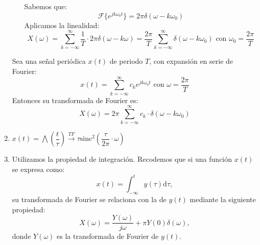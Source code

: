 \begin{enumerate}[label=\color{red}\textbf{\arabic*)}]
\begin{enumerate}[label=Paso \arabic*:]
    Sabemos que: \[
    \mathcal{F}\{e^{jk\omega_0t} \} =2\pi\delta(\omega-k\omega_0)
    \] 
    Aplicamos la linealidad: \[
    X(\omega)=\sum_{k=-\infty}^{\infty} \dfrac{1}{T}\cdot 2\pi\delta(\omega-k\omega)=\dfrac{2\pi}{T}\sum_{k=-\infty}^{\infty} \delta(\omega-k\omega_0)\text{ con }\omega_0=\dfrac{2\pi}{T}
    \] 
\end{enumerate}
\begin{tcolorbox}[colback=red!5!white, colframe=red!75!black, title=\textbf{Nota: Transformada de Fourier de una señal periódica}]
Sea una señal periódica $x(t)$ de periodo  $T$, con expansión en serie de Fourier:  \[
x(t)=\sum_{k=-\infty}^{\infty} c_ke^{jk\omega_0t}\text{ con } \omega=\dfrac{2\pi}{T}
\] 
Entonces su transformada de Fourier es: \[
X(\omega)=2\pi \sum_{k=-\infty}^{\infty} c_k\cdot \delta(\omega-k\omega_0)
\]
\end{tcolorbox}
\item {} 
$x(t)=\bigwedge \left( \dfrac{t}{\tau} \right)\xrightarrow{TF}\tau\text{sinc}^2\left( \dfrac{\tau}{2\pi}\cdot \omega \right) $
\item {} 

   \begin{minipage}{0.45\textwidth}
   \end{minipage}\qquad
   \begin{minipage}{0.45\textwidth}
       Utilizamos la propiedad de integración. Recodemos que si una función $x(t)$ se expresa como:  \[
       x(t)=\int_{-\infty}^{t} y(\tau)\mathrm{d}\tau, 
       \] 
       su transformada de Fourier se relaciona con la de $y(t)$ mediante la siguiente propiedad:  \[
       X(\omega)=\dfrac{Y(\omega)}{j\omega}+\pi Y(0)\delta(\omega),
       \] 
       donde $Y(\omega)$ es la transformada de Fourier de $y(t)$.
   \end{minipage}


\end{enumerate}
